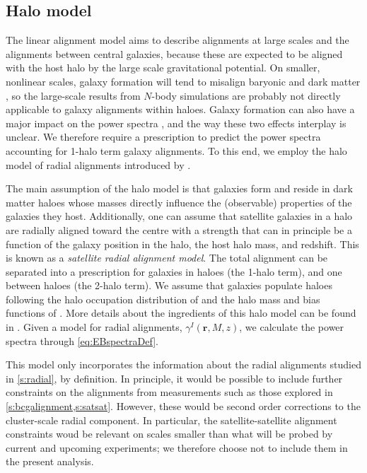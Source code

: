 \subsection{Halo model}

The linear alignment model aims to describe alignments at large scales and the alignments 
between central galaxies, because these are expected to be aligned with the host halo by the large 
scale gravitational potential. On smaller, nonlinear scales, galaxy formation will tend to misalign 
baryonic and dark matter \citep[e.g.,][]{pereira10,tenneti14}, so the large-scale results from 
$N$-body simulations are probably not directly applicable to galaxy alignments within haloes. 
Galaxy formation can also have a major impact on the power spectra \citep{vandaalen11,semboloni11}, 
and the way these two effects interplay is unclear. We therefore require a prescription to predict 
the power spectra accounting for 1-halo term galaxy alignments. To this end, we employ the halo 
model of radial alignments introduced by \cite{schneider10}.

The main assumption of the halo model is that galaxies form and reside in dark matter haloes whose 
masses directly influence the (observable) properties of the galaxies they host. Additionally, 
one can assume that satellite galaxies in a halo are radially aligned toward the centre with a 
strength that can in principle be a function of the galaxy position in the halo, the host halo 
mass, and redshift. This is known as a \textit{satellite radial alignment model}. The total 
alignment can be separated into a prescription for galaxies in haloes (the 1-halo term), and 
one between haloes (the 2-halo term). We assume that galaxies populate haloes following the halo 
occupation distribution of \cite{cacciato13} and the halo mass and bias functions of 
\cite{tinker10}. More details about the ingredients of this halo model can be found in 
\cite{schneider10}. Given a model for radial alignments, $\gamma^I(\mathbf{r},M,z)$, we calculate 
the power spectra through \cref{eq:EBspectraDef}.

This model only incorporates the information about the radial alignments studied in 
\cref{s:radial}, by definition. In principle, it would be possible to include further constraints 
on 
the alignments from measurements such as those explored in \cref{s:bcgalignment,s:satsat}. However, 
these would be second order corrections to the cluster-scale radial component. In particular, the 
satellite-satellite alignment constraints woud be relevant on scales smaller than what will be 
probed by current and upcoming experiments; we therefore choose not to include them in the present 
analysis.

